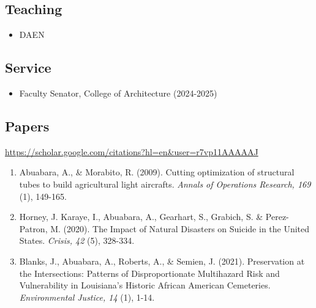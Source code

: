 \documentclass[11pt]{article}
\begin{document}
\subsection*{Teaching}
\begin{itemize}[leftmargin=20pt]
\item DAEN 
\end{itemize}


\subsection*{Service}
\begin{itemize}[leftmargin=20pt]
\item Faculty Senator, College of Architecture (2024-2025)
\end{itemize}

\subsection*{Papers}
\url{https://scholar.google.com/citations?hl=en&user=r7vp11AAAAAJ}
\begin{enumerate}[leftmargin=20pt]
\item Abuabara, A., \& Morabito, R. (2009). Cutting optimization of structural tubes to build agricultural light aircrafts. \emph{Annals of Operations Research, 169} (1), 149-165.
\item Horney, J. Karaye, I., Abuabara, A., Gearhart, S., Grabich, S. \& Perez-Patron, M. (2020). The Impact of Natural Disasters on Suicide in the United States. \emph{Crisis, 42} (5), 328-334.
\item Blanks, J., Abuabara, A., Roberts, A., \& Semien, J. (2021). Preservation at the Intersections: Patterns of Disproportionate Multihazard Risk and Vulnerability in Louisiana's Historic African American Cemeteries. \emph{Environmental Justice, 14} (1), 1-14.
\end{enumerate}
\end{document}
